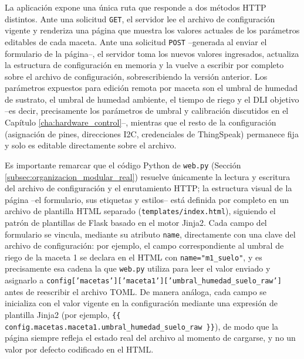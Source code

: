 La aplicación expone una única ruta que responde a dos métodos HTTP distintos. Ante una solicitud \texttt{GET}, el servidor lee el archivo de configuración vigente y renderiza una página que muestra los valores actuales de los parámetros editables de cada maceta. Ante una solicitud \texttt{POST} --generada al enviar el formulario de la página--, el servidor toma los nuevos valores ingresados, actualiza la estructura de configuración en memoria y la vuelve a escribir por completo sobre el archivo de configuración, sobrescribiendo la versión anterior. Los parámetros expuestos para edición remota por maceta son el umbral de humedad de sustrato, el umbral de humedad ambiente, el tiempo de riego y el DLI objetivo --es decir, precisamente los parámetros de umbral y calibración discutidos en el Capítulo \ref{cha:hardware_control}--, mientras que el resto de la configuración (asignación de pines, direcciones I2C, credenciales de ThingSpeak) permanece fija y solo es editable directamente sobre el archivo.

Es importante remarcar que el código Python de \texttt{web.py} (Sección \ref{subsec:organizacion_modular_real}) resuelve únicamente la lectura y escritura del archivo de configuración y el enrutamiento HTTP; la estructura visual de la página --el formulario, sus etiquetas y estilos-- está definida por completo en un archivo de plantilla HTML separado (\texttt{templates/index.html}), siguiendo el patrón de plantillas de Flask basado en el motor Jinja2. Cada campo del formulario se vincula, mediante su atributo \texttt{name}, directamente con una clave del archivo de configuración: por ejemplo, el campo correspondiente al umbral de riego de la maceta 1 se declara en el HTML con \texttt{name="m1\_suelo"}, y es precisamente esa cadena la que \texttt{web.py} utiliza para leer el valor enviado y asignarlo a \texttt{config['macetas']['maceta1']['umbral\_humedad\_suelo\_raw']} antes de reescribir el archivo TOML. De manera análoga, cada campo se inicializa con el valor vigente en la configuración mediante una expresión de plantilla Jinja2 (por ejemplo, \texttt{\{\{ config.macetas.maceta1.umbral\_humedad\_suelo\_raw \}\}}), de modo que la página siempre refleja el estado real del archivo al momento de cargarse, y no un valor por defecto codificado en el HTML.

